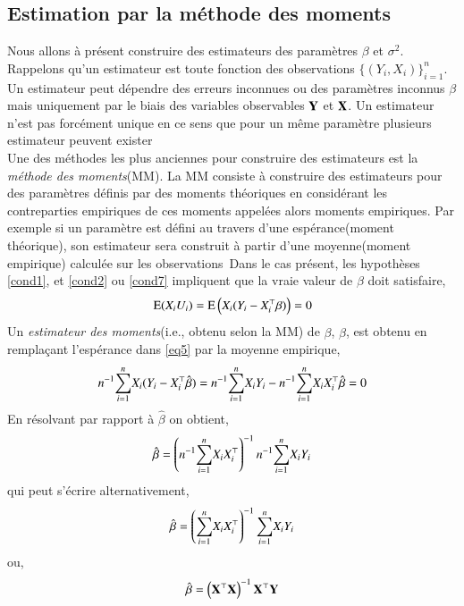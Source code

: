 \documentclass[10pt, reqno]{amsart}
\begin{document}
\subsection{Estimation par la méthode des moments}
Nous allons à présent construire des estimateurs des paramètres $\beta$ et $\sigma^2$. Rappelons qu'un estimateur est toute fonction des observations $\{(Y_i, X_i)\}_{i=1}^n$. Un estimateur peut dépendre des erreurs inconnues ou des paramètres inconnus $\beta$ mais uniquement par le biais des variables observables $\mathbf Y$ et $\mathbf X$. Un estimateur n'est pas forcément unique en ce sens que pour un même paramètre plusieurs estimateur peuvent exister\\
Une des méthodes les plus anciennes pour construire des estimateurs est la \emph{méthode des moments}(MM). La MM consiste à construire des estimateurs pour des paramètres définis par des moments théoriques en considérant les contreparties empiriques de ces moments appelées alors moments empiriques. Par exemple si un paramètre est défini au travers d'une espérance(moment théorique), son  estimateur sera construit à partir d'une moyenne(moment empirique) calculée sur les observations\
Dans le cas présent, les hypothèses \eqref{cond1}, et \eqref{cond2} ou \eqref{cond7} impliquent que la vraie valeur de $\beta$ doit satisfaire,
\begin{align}
\operatorname{E}(X_iU_i) = \operatorname{E}\left(X_i(Y_i-X_i^\top\beta)\right) = 0
\label{eq5}
\end{align}
 Un \emph{estimateur des moments}(i.e., obtenu selon la MM) de $\beta$, $\hat{\beta}$,  est obtenu en remplaçant l'espérance dans \eqref{eq5} par la moyenne empirique,
\begin{align}
n^{-1}\underset{i=1}{\overset{n}{\sum}} X_i(Y_i - X_i^\top\hat{\beta}) = n^{-1}\underset{i=1}{\overset{n}{\sum}} X_iY_i - n^{-1}\underset{i=1}{\overset{n}{\sum}} X_iX_i^\top\hat{\beta} = 0
\label{eq6}
\end{align}
En résolvant par rapport à $\hat{\beta}$ on obtient,
\begin{align}
\hat{\beta} = \left(n^{-1}\underset{i=1}{\overset{n}{\sum}} X_iX_i^\top\right)^{-1}n^{-1}\underset{i=1}{\overset{n}{\sum}} X_iY_i
\label{eq7}
\end{align}
qui peut s'écrire alternativement,
\begin{align}
\hat{\beta} = \left(\underset{i=1}{\overset{n}{\sum}} X_iX_i^\top\right)^{-1}\underset{i=1}{\overset{n}{\sum}} X_iY_i
\label{eq8}
\end{align}
ou,
\begin{align}
\hat{\beta} = \left(\mathbf X^\top\mathbf X\right)^{-1}\mathbf X^\top\mathbf Y
\label{eq9}
\end{align}
\end{document}
